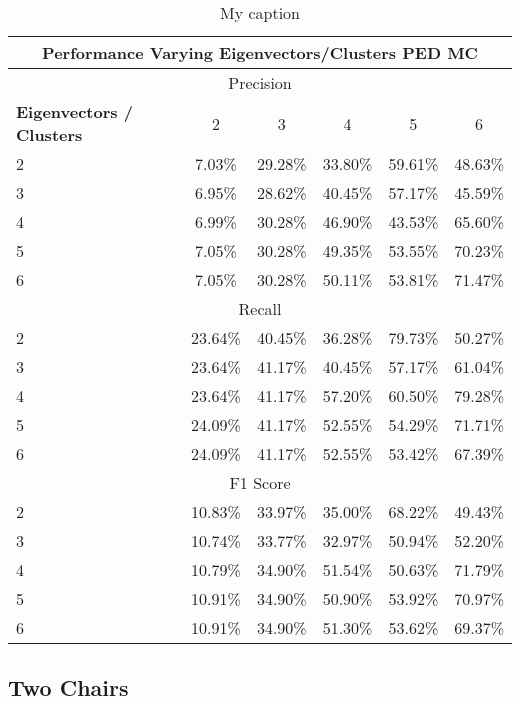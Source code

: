 %
\begin{table}[H]
\centering
\begin{tabular}{|l|c|c|c|c|c|}
\hline
\multicolumn{6}{|c|}{Performance Varying Eigenvectors/Clusters PED MC} \\ \hline
\multicolumn{6}{|c|}{Precision} \\ \hline
\textbf{Eigenvectors / Clusters} & 2 & 3 & 4 & 5 & 6 \\ \hline
2 & 7.03\% & 29.28\% & 33.80\% & 59.61\% & 48.63\%  \\ \hline
3 & 6.95\% & 28.62\% & 40.45\% & 57.17\% & 45.59\%  \\ \hline
4 & 6.99\% & 30.28\% & 46.90\% & 43.53\% & 65.60\%  \\ \hline
5 & 7.05\% & 30.28\% & 49.35\% & 53.55\% & 70.23\%  \\ \hline
6 & 7.05\% & 30.28\% & 50.11\% & 53.81\% & 71.47\%  \\ \hline
\multicolumn{6}{|c|}{Recall} \\ \hline
2 & 23.64\% & 40.45\% & 36.28\% & 79.73\% & 50.27\%  \\ \hline
3 & 23.64\% & 41.17\% & 40.45\% & 57.17\% & 61.04\%  \\ \hline
4 & 23.64\% & 41.17\% & 57.20\% & 60.50\% & 79.28\%  \\ \hline
5 & 24.09\% & 41.17\% & 52.55\% & 54.29\% & 71.71\%  \\ \hline
6 & 24.09\% & 41.17\% & 52.55\% & 53.42\% & 67.39\%  \\ \hline
\multicolumn{6}{|c|}{F1 Score} \\ \hline
2 & 10.83\% & 33.97\% & 35.00\% & 68.22\% & 49.43\%  \\ \hline
3 & 10.74\% & 33.77\% & 32.97\% & 50.94\% & 52.20\%  \\ \hline
4 & 10.79\% & 34.90\% & 51.54\% & 50.63\% & 71.79\%  \\ \hline
5 & 10.91\% & 34.90\% & 50.90\% & 53.92\% & 70.97\%  \\ \hline
6 & 10.91\% & 34.90\% & 51.30\% & 53.62\% & 69.37\%  \\ \hline
\end{tabular}
\caption[Performance Varying Eigenvector-Cluster]{My caption}
\label{tab:ev_c}
\end{table}



\subsection{Two Chairs}


